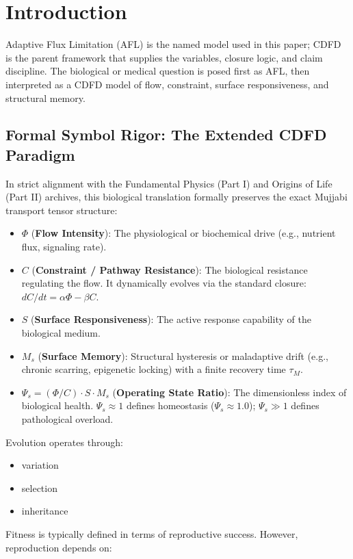 \documentclass[11pt]{article}
\begin{document}
\section{Introduction}

Adaptive Flux Limitation (AFL) is the named model used in this paper; CDFD is the parent framework that supplies the variables, closure logic, and claim discipline. The biological or medical question is posed first as AFL, then interpreted as a CDFD model of flow, constraint, surface responsiveness, and structural memory.

\subsection{Formal Symbol Rigor: The Extended CDFD Paradigm}
In strict alignment with the Fundamental Physics (Part I) and Origins of Life (Part II) archives, this biological translation formally preserves the exact Mujjabi transport tensor structure:
\begin{itemize}
    \item $\Phi$ (\textbf{Flow Intensity}): The physiological or biochemical drive (e.g., nutrient flux, signaling rate).
    \item $C$ (\textbf{Constraint / Pathway Resistance}): The biological resistance regulating the flow. It dynamically evolves via the standard closure: $dC/dt = \alpha \Phi - \beta C$.
    \item $S$ (\textbf{Surface Responsiveness}): The active response capability of the biological medium.
    \item $M_s$ (\textbf{Surface Memory}): Structural hysteresis or maladaptive drift (e.g., chronic scarring, epigenetic locking) with a finite recovery time $\tau_M$.
    \item $\Psi_s = (\Phi/C) \cdot S \cdot M_s$ (\textbf{Operating State Ratio}): The dimensionless index of biological health. $\Psi_s \approx 1$ defines homeostasis ($\Psi_s \approx 1.0$); $\Psi_s \gg 1$ defines pathological overload.
\end{itemize}


Evolution operates through:

\begin{itemize}
    \item variation
    \item selection
    \item inheritance
\end{itemize}

Fitness is typically defined in terms of reproductive success. However, reproduction depends on:
\end{document}
